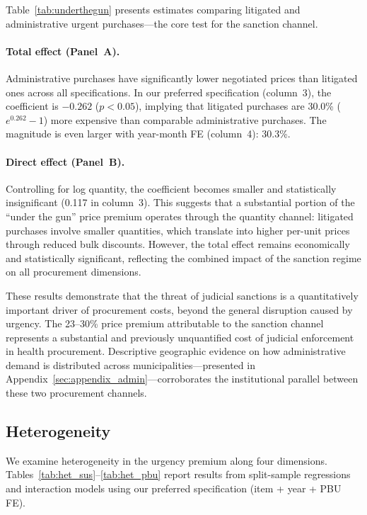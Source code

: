 Table~\ref{tab:underthegun} presents estimates comparing litigated and administrative urgent purchases---the core test for the sanction channel.



\paragraph{Total effect (Panel~A).}
Administrative purchases have significantly lower negotiated prices than litigated ones across all specifications. In our preferred specification (column~3), the coefficient is $-0.262$ ($p < 0.05$), implying that litigated purchases are 30.0\% ($e^{0.262}-1$) more expensive than comparable administrative purchases. The magnitude is even larger with year-month FE (column~4): 30.3\%.

\paragraph{Direct effect (Panel~B).}
Controlling for log quantity, the coefficient becomes smaller and statistically insignificant (0.117 in column~3). This suggests that a substantial portion of the ``under the gun'' price premium operates through the quantity channel: litigated purchases involve smaller quantities, which translate into higher per-unit prices through reduced bulk discounts. However, the total effect remains economically and statistically significant, reflecting the combined impact of the sanction regime on all procurement dimensions.

These results demonstrate that the threat of judicial sanctions is a quantitatively important driver of procurement costs, beyond the general disruption caused by urgency. The 23--30\% price premium attributable to the sanction channel represents a substantial and previously unquantified cost of judicial enforcement in health procurement. Descriptive geographic evidence on how administrative demand is distributed across municipalities---presented in Appendix~\ref{sec:appendix_admin}---corroborates the institutional parallel between these two procurement channels.

\subsection{Heterogeneity}
\label{sec:heterogeneity}

We examine heterogeneity in the urgency premium along four dimensions. Tables~\ref{tab:het_sus}--\ref{tab:het_pbu} report results from split-sample regressions and interaction models using our preferred specification (item + year + PBU FE).

